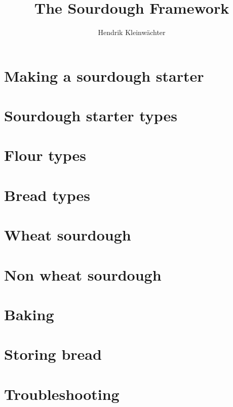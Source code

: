 \documentclass[paper=a4, twoside=false, fontsize=12pt, parskip=half,
                bibliography=totoc, listof=totoc]{scrbook}
\author{Hendrik Kleinwächter}
\title{The Sourdough Framework}
\begin{document}

\titlepage

\frontmatter
{%
\hypersetup{hidelinks}
\ifdefined\HCode\else\tableofcontents\fi
}





\mainmatter





\chapter{Making a sourdough starter}


\chapter{Sourdough starter types}


\chapter{Flour types}


\chapter{Bread types}


\chapter{Wheat sourdough}%
\label{chapter:wheat-sourdough}


\chapter{Non wheat sourdough}%
\label{chapter:non-wheat-sourdough}


% 
\chapter{Baking}%
\label{chapter:baking}


\chapter{Storing bread}%
\label{chapter:storing-bread}


\chapter{Troubleshooting}


\backmatter
\printbibliography
{%
\hypersetup{hidelinks}
\listofflowcharts
\listoftables
\listoffigures
}
\end{document}
